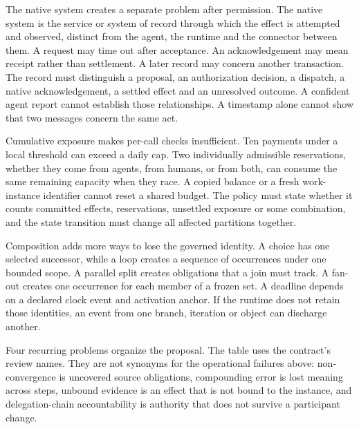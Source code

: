 \documentclass[
  american,
  11pt,
  letterpaper,
]{article}
\begin{document}
The native system creates a separate problem after permission. The
native system is the service or system of record through which the
effect is attempted and observed, distinct from the agent, the runtime
and the connector between them. A request may time out after acceptance.
An acknowledgement may mean receipt rather than settlement. A later
record may concern another transaction. The record must distinguish a
proposal, an authorization decision, a dispatch, a native
acknowledgement, a settled effect and an unresolved outcome. A confident
agent report cannot establish those relationships. A timestamp alone
cannot show that two messages concern the same act.

Cumulative exposure makes per-call checks insufficient. Ten payments
under a local threshold can exceed a daily cap. Two individually
admissible reservations, whether they come from agents, from humans, or
from both, can consume the same remaining capacity when they race. A
copied balance or a fresh work-instance identifier cannot reset a shared
budget. The policy must state whether it counts committed effects,
reservations, unsettled exposure or some combination, and the state
transition must change all affected partitions together.

Composition adds more ways to lose the governed identity. A choice has
one selected successor, while a loop creates a sequence of occurrences
under one bounded scope. A parallel split creates obligations that a
join must track. A fan-out creates one occurrence for each member of a
frozen set. A deadline depends on a declared clock event and activation
anchor. If the runtime does not retain those identities, an event from
one branch, iteration or object can discharge another.

Four recurring problems organize the proposal. The table uses the
contract's review names. They are not synonyms for the operational
failures above: non-convergence is uncovered source obligations,
compounding error is lost meaning across steps, unbound evidence is an
effect that is not bound to the instance, and delegation-chain
accountability is authority that does not survive a participant change.
\end{document}
